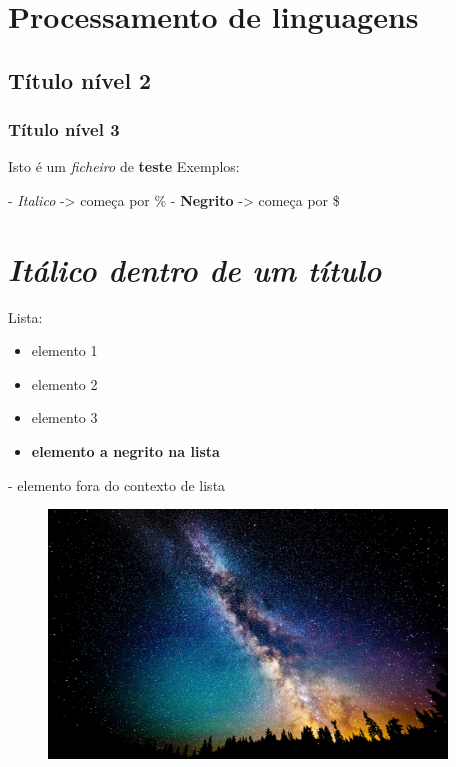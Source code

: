 \documentclass{article}
\begin{document}
\section{ Processamento de linguagens }

\subsection{ Título nível 2 }

\subsubsection{ Título nível 3 }


Isto é um \textit{ ficheiro } de \textbf{ teste }
Exemplos:

	- \textit{ Italico } -> começa por \%
	- \textbf{ Negrito } -> começa por \$

\section{ \textit{ Itálico dentro de um título } }


Lista:

\begin{itemize}
 
	
	\item  elemento 1
	
	\item  elemento 2
	
	\item  elemento 3
	
	\item  \textbf{ elemento a negrito na lista }
\end{itemize}

	- elemento fora do contexto de lista
	
\begin{figure}[h]
\includegraphics[width=400px]{ Image1.jpg }

\end{figure}
\end{document}

